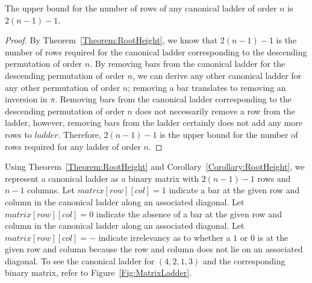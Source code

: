  \begin{corollary}
     The upper bound for the number of rows of any canonical ladder of order $n$ is $2(n-1)-1$.
     \label{Corollary:RootHeight}
 \end{corollary}
 \begin{proof}
     By Theorem~\ref{Theorem:RootHeight}, we know that $2(n-1)-1$ is the number of rows required for 
     the canonical ladder corresponding 
     to the descending permutation of order $n$. By removing 
     bars from the canonical ladder for the descending permutation of order $n$, we can derive any other canonical ladder for any other permutation 
     of order $n$; removing a bar translates to removing an 
     inversion in $\pi$. Removing bars from the canonical ladder corresponding to the descending permutation of order $n$ 
     does not necessarily remove a row from the ladder, however, removing bars from the ladder certainly does not add any more rows 
     to $ladder$. Therefore, $2(n-1)-1$ is the upper bound for the number of rows required for any ladder of order $n$.
 \end{proof}
Using Theorem~\ref{Theorem:RootHeight} and Corollary~\ref{Corollary:RootHeight}, 
we represent a canonical ladder as a binary matrix with $2(n-1)-1$ rows and $n-1$ columns. Let $matrix[row][col]=1$ 
indicate a bar at the given row and column in the canonical ladder along an associated diagonal. Let $matrix[row][col]=0$ indicate the absence 
of a bar at the given row and column in the canonical ladder along an associated diagonal. Let $matrix[row][col]=-$ indicate irrelevancy as to whether 
a $1$ or $0$ is at the given row and column because the row and column does not lie on an associated diagonal. To see the canonical ladder for 
$(4,2,1,3)$ and the corresponding binary matrix, refer to Figure~\ref{Fig:MatrixLadder}.
